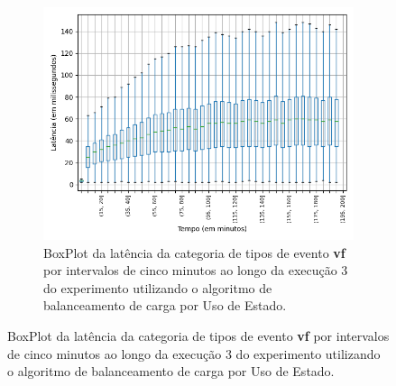 

\begin{figure}
\centering
\begin{subfigure}{.5\textwidth}
\centering
\includegraphics[width=\textwidth]{figuras/graphics/boxplot_8-dez-su_vf.png}
\caption{BoxPlot da latência da categoria de tipos de evento \textbf{vf} por intervalos de cinco minutos ao longo da execução 3 do experimento utilizando o algoritmo de balanceamento de carga por Uso de Estado.}
\label{fig:BoxPlot_vf_SU_8-dez-su}
\end{subfigure}%


\end{figure}
